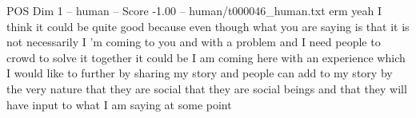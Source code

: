 \begin{textsample}{POS Dim 1 – human – Score -1.00 – human/t000046\_human.txt}  \label{ex:f1_pos_018}
erm yeah I think it could be quite good because even though what you are saying is that it is not necessarily I 'm coming to you and with a problem and I need people to crowd to solve it together it could be I am coming here with an experience which I would like to further by sharing my story and people can add to my story by the very nature that they are social that they are social beings and that they will have input to what I am saying at some point

\end{textsample}
